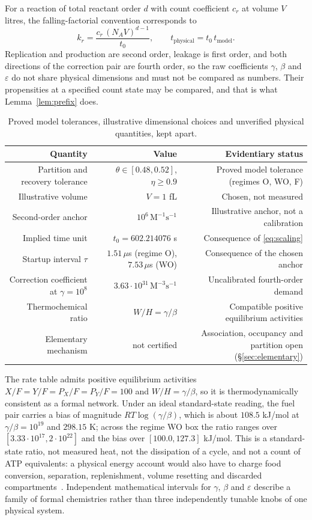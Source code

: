 \documentclass[11pt,a4paper]{article}
\theoremstyle{plain}
\theoremstyle{definition}
\theoremstyle{remark}
\newcommand{\eps}{\varepsilon}
\begin{document}
For a reaction of total reactant order $d$ with count coefficient $c_r$ at volume $V$
litres, the falling-factorial convention corresponds to
\begin{equation}
k_r=\frac{c_r\,(N_AV)^{d-1}}{t_0},\qquad t_{\text{physical}}=t_0\,t_{\text{model}} .
\label{eq:scaling}
\end{equation}
Replication and production are second order, leakage is first order, and both directions
of the correction pair are fourth order, so the raw coefficients $\gamma$, $\beta$ and
$\eps$ do not share physical dimensions and must not be compared as numbers. Their
propensities at a specified count state may be compared, and that is what
Lemma~\ref{lem:prefix} does.

\begin{table}[htbp]\centering\small
\begin{tabular}{@{}RRR@{}}\toprule
Quantity & Value & Evidentiary status\\\midrule
Partition and recovery tolerance & $\theta\in[0.48,0.52]$, $\eta\ge0.9$ &
  Proved model tolerance (regimes O, WO, F)\\
Illustrative volume & $V=1$ fL & Chosen, not measured\\
Second-order anchor & $10^{6}\,\mathrm M^{-1}\mathrm s^{-1}$ &
  Illustrative anchor, not a calibration\\
Implied time unit & $t_0=602.214076$ s & Consequence of \eqref{eq:scaling}\\
Startup interval $\tau$ & $1.51\,\mu$s (regime O), $7.53\,\mu$s (WO) &
  Consequence of the chosen anchor\\
Correction coefficient at $\gamma=10^{8}$ & $3.63\cdot10^{31}\,\mathrm M^{-3}\mathrm
  s^{-1}$ & Uncalibrated fourth-order demand\\
Thermochemical ratio & $W/H=\gamma/\beta$ &
  Compatible positive equilibrium activities\\
Elementary mechanism & not certified &
  Association, occupancy and partition open (\S\ref{sec:elementary})\\\bottomrule
\end{tabular}
\caption{Proved model tolerances, illustrative dimensional choices and unverified
physical quantities, kept apart.}\label{tab:physical}
\end{table}

The rate table admits positive equilibrium activities $X/F=Y/F=P_X/F=P_Y/F=100$ and
$W/H=\gamma/\beta$, so it is thermodynamically consistent as a formal network. Under an
ideal standard-state reading, the fuel pair carries a bias of magnitude
$RT\log(\gamma/\beta)$, which is about $108.5$ kJ/mol at $\gamma/\beta=10^{19}$ and
$298.15$ K; across the regime WO box the ratio ranges over $[3.33\cdot10^{17},
2\cdot10^{22}]$ and the bias over $[100.0,127.3]$ kJ/mol. This is a standard-state ratio,
not measured heat, not the dissipation of a cycle, and not a count of ATP equivalents: a
physical energy account would also have to charge food conversion, separation,
replenishment, volume resetting and discarded compartments~\citep{rao2016}. Independent
mathematical intervals for $\gamma$, $\beta$ and $\eps$ describe a family of formal
chemistries rather than three independently tunable knobs of one physical system.
\end{document}
